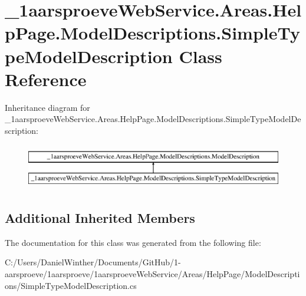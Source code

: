 \hypertarget{class__1aarsproeve_web_service_1_1_areas_1_1_help_page_1_1_model_descriptions_1_1_simple_type_model_description}{}\section{\+\_\+1aarsproeve\+Web\+Service.\+Areas.\+Help\+Page.\+Model\+Descriptions.\+Simple\+Type\+Model\+Description Class Reference}
\label{class__1aarsproeve_web_service_1_1_areas_1_1_help_page_1_1_model_descriptions_1_1_simple_type_model_description}
Inheritance diagram for \+\_\+1aarsproeve\+Web\+Service.\+Areas.\+Help\+Page.\+Model\+Descriptions.\+Simple\+Type\+Model\+Description\+:\begin{figure}[H]
\begin{center}
\leavevmode
\includegraphics[height=2.000000cm]{class__1aarsproeve_web_service_1_1_areas_1_1_help_page_1_1_model_descriptions_1_1_simple_type_model_description}
\end{center}
\end{figure}
\subsection*{Additional Inherited Members}


The documentation for this class was generated from the following file\+:\begin{DoxyCompactItemize}
\item 
C\+:/\+Users/\+Daniel\+Winther/\+Documents/\+Git\+Hub/1-\/aarsproeve/1aarsproeve/1aarsproeve\+Web\+Service/\+Areas/\+Help\+Page/\+Model\+Descriptions/Simple\+Type\+Model\+Description.\+cs\end{DoxyCompactItemize}
